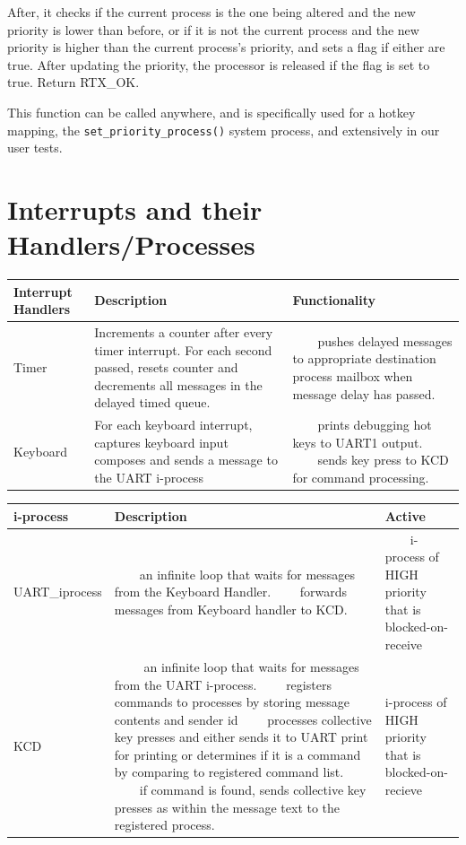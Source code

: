 \documentclass[11pt, oneside]{article}
\newcommand{\tabitem}{~~\llap{\textbullet}~~}
\begin{document}
After, it checks if the current process is the one being altered and the new priority is lower than before, or if it is not the current process and the new priority is higher than the current process's priority, and sets a flag if either are true. After updating the priority, the processor is released if the flag is set to true. Return RTX\_OK.

This function can be called anywhere, and is specifically used for a hotkey mapping, the {\tt set\_priority\_process()} system process, and extensively in our user tests.

\section{Interrupts and their Handlers/Processes}

\begin{tabular}{|L{2cm}|L{5cm}|L{5cm}|} \hline
 \textbf{Interrupt Handlers} & \textbf{Description} & \textbf{Functionality} \\ \hline
Timer &
Increments a counter after every timer interrupt. For each second passed, resets counter and decrements all messages in the delayed timed queue.
&
\tabitem pushes delayed messages to appropriate destination process mailbox when message delay has passed.
\\ \hline
Keyboard & For each keyboard interrupt, captures keyboard input composes and sends a message to the UART i-process &

\tabitem prints debugging hot keys to UART1 output. \newline
\tabitem sends key press to KCD for command processing. \\ \hline
\end{tabular}

\begin{tabular}{|L{3cm}|L{6cm}|L{3cm}|} \hline
\textbf{i-process}& Description & Active \\ \hline
UART\_iprocess& 
\tabitem an infinite loop that waits for messages from the Keyboard Handler.
\newline 
\tabitem forwards messages from Keyboard handler to KCD.
 & \tabitem i-process of HIGH priority that is blocked-on-receive
 \newline
  \\ \hline
KCD& 
\tabitem
an infinite loop that waits for messages from the UART i-process.
\newline
\tabitem registers commands to processes by storing message contents and sender id
\newline
\tabitem processes collective key presses and either sends it to UART print for printing or determines if it is a command by comparing to registered command list.
\newline
\tabitem if command is found, sends collective key presses as within the message text to the registered process.
 & i-process of HIGH priority that is blocked-on-recieve \\ \hline
\end{tabular}
\end{document}
